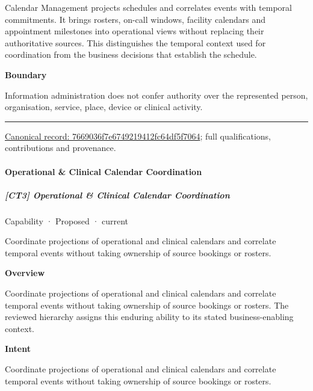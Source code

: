 Calendar Management projects schedules and correlates events with temporal commitments. It brings rosters, on-call windows, facility calendars and appointment milestones into operational views without replacing their authoritative sources. This distinguishes the temporal context used for coordination from the business decisions that establish the schedule.



\textbf{Boundary}



Information administration does not confer authority over the represented person, organisation, service, place, device or clinical activity.



\medskip\hrule\medskip

{\footnotesize \href{../../../../continuum/strategy/capability/7669036f7e6749219412fc64df5f7064.md}{Canonical record: 7669036f7e6749219412fc64df5f7064}; full qualifications, contributions and provenance.}\par
\paragraph{Operational \& Clinical Calendar Coordination}

\subparagraph{[CT3] Operational \& Clinical Calendar Coordination}

\label{element:f6d8f1310ba543f69e8b57bf05603db3}
{\small Capability · Proposed · current}\par

Coordinate projections of operational and clinical calendars and correlate temporal events without taking ownership of source bookings or rosters.



\textbf{Overview}



Coordinate projections of operational and clinical calendars and correlate temporal events without taking ownership of source bookings or rosters. The reviewed hierarchy assigns this enduring ability to its stated business-enabling context.



\textbf{Intent}



Coordinate projections of operational and clinical calendars and correlate temporal events without taking ownership of source bookings or rosters.



